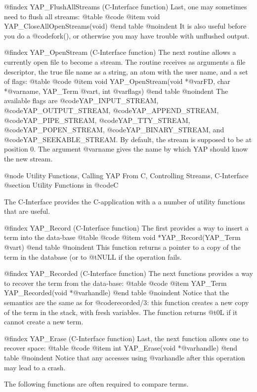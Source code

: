 @findex YAP_FlushAllStreams (C-Interface function)
Last, one may sometimes need to flush all streams:
@table @code
 @item     void      YAP_CloseAllOpenStreams(void)
@end table
@noindent
It is also useful before you do a @code{fork()}, or otherwise you may
have trouble with unflushed output.

@findex YAP_OpenStream (C-Interface function)
The next routine allows a currently open file to become a stream. The
routine receives as arguments a file descriptor, the true file name as a
string, an atom with the user name, and a set of flags:
@table @code
  @item    void      YAP_OpenStream(void *@var{FD}, char *@var{name}, YAP_Term @var{t}, int @var{flags})
@end table
@noindent
The available flags are @code{YAP_INPUT_STREAM},
@code{YAP_OUTPUT_STREAM}, @code{YAP_APPEND_STREAM},
@code{YAP_PIPE_STREAM}, @code{YAP_TTY_STREAM}, @code{YAP_POPEN_STREAM},
@code{YAP_BINARY_STREAM}, and @code{YAP_SEEKABLE_STREAM}. By default, the
stream is supposed to be at position 0. The argument @var{name} gives
the name by which YAP should know the new stream.

@node Utility Functions, Calling YAP From C, Controlling Streams, C-Interface
@section Utility Functions in @code{C}


The C-Interface  provides the C-application with a a number of utility
functions that are useful.


@findex YAP_Record (C-Interface function)
The first provides a way to insert a term into the data-base
@table @code
@item      void      *YAP_Record(YAP_Term @var{t})
@end table
@noindent
This function returns a pointer to a copy of the term in the database
(or to @t{NULL} if the operation fails.

@findex YAP_Recorded (C-Interface function)
The next functions provides a way to recover the term from the data-base:
@table @code
 @item     YAP_Term      YAP_Recorded(void *@var{handle})
@end table
@noindent
Notice that the semantics are the same as for @code{recorded/3}: this
function creates a new copy of the term in the stack, with fresh
variables. The function returns @t{0L} if it cannot create a new term.

@findex YAP_Erase (C-Interface function)
Last, the next function allows one to recover space:
@table @code
  @item    int      YAP_Erase(void *@var{handle})
@end table
@noindent
Notice that any accesses using @var{handle} after this operation may
lead to a crash.

The following functions are often required to compare terms.

